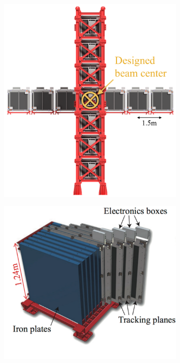 \begin{figure}[h]
  \begin{subfigure}[t]{0.45\textwidth}
    \includegraphics[width=\textwidth, trim={0mm 0mm 0mm 0mm}, clip,page=1]{Figures/Detectors/T2KINGRIDDiagram.pdf}
  \end{subfigure}%
  \begin{subfigure}[t]{0.55\textwidth}
    \includegraphics[width=\textwidth, trim={0mm 0mm 0mm 0mm}, clip,page=1]{Figures/Detectors/T2KINGRIDModule.pdf}

\end{subfigure}
\end{figure}
